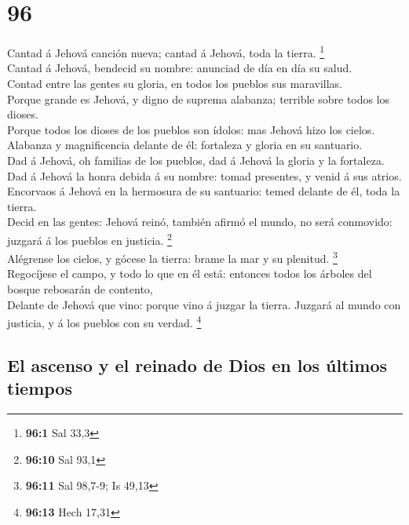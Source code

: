 \hypertarget{section-95}{%
\section{96}\label{section-95}}

 Cantad á Jehová canción nueva; cantad á Jehová, toda la
tierra. \footnote{\textbf{96:1} Sal 33,3}\\
 Cantad á Jehová, bendecid su nombre: anunciad de día en
día su salud.\\
 Contad entre las gentes su gloria, en todos los pueblos
sus maravillas.\\
 Porque grande es Jehová, y digno de suprema alabanza;
terrible sobre todos los dioses.\\
 Porque todos los dioses de los pueblos son ídolos: mas
Jehová hizo los cielos.\\
 Alabanza y magnificencia delante de él: fortaleza y
gloria en su santuario.\\
 Dad á Jehová, oh familias de los pueblos, dad á Jehová la
gloria y la fortaleza.\\
 Dad á Jehová la honra debida á su nombre: tomad
presentes, y venid á sus atrios.\\
 Encorvaos á Jehová en la hermosura de su santuario: temed
delante de él, toda la tierra.\\
 Decid en las gentes: Jehová reinó, también afirmó el
mundo, no será conmovido: juzgará á los pueblos en justicia.
\footnote{\textbf{96:10} Sal 93,1}\\
 Alégrense los cielos, y gócese la tierra: brame la mar y
su plenitud. \footnote{\textbf{96:11} Sal 98,7-9; Is 49,13}\\
 Regocíjese el campo, y todo lo que en él está: entonces
todos los árboles del bosque rebosarán de contento,\\
 Delante de Jehová que vino: porque vino á juzgar la
tierra. Juzgará al mundo con justicia, y á los pueblos con su verdad.
\footnote{\textbf{96:13} Hech 17,31}

\hypertarget{el-ascenso-y-el-reinado-de-dios-en-los-uxfaltimos-tiempos}{%
\subsection{El ascenso y el reinado de Dios en los últimos
tiempos}\label{el-ascenso-y-el-reinado-de-dios-en-los-uxfaltimos-tiempos}}

